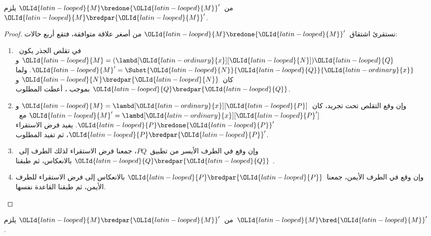 \documentclass[../../../include/open-logic-section]{subfiles}
\begin{document}


\begin{lem}
  من~${\OLId{latin-looped}{M}} \bredone {\OLId{latin-looped}{M}}'$ يلزم~${\OLId{latin-looped}{M}} \bredpar {\OLId{latin-looped}{M}}'$.
\end{lem}
\begin{proof}
  نستقرئ اشتقاق~${\OLId{latin-looped}{M}} \bredone {\OLId{latin-looped}{M}}'$ من أصغر علاقة متوافقة، فتقع أربع حالات:
  \begin{enumerate}
  \item في تقلص الجذر يكون~${\OLId{latin-looped}{M}}=(\lambd[{\OLId{latin-ordinary}{x}}][{\OLId{latin-looped}{N}}]){\OLId{latin-looped}{Q}}$ و
    ${\OLId{latin-looped}{M}}'=\Subst{{\OLId{latin-looped}{N}}}{{\OLId{latin-looped}{Q}}}{{\OLId{latin-ordinary}{x}}}$. ولما كان~${\OLId{latin-looped}{N}}\bredpar {\OLId{latin-looped}{N}}$ و${\OLId{latin-looped}{Q}}\bredpar {\OLId{latin-looped}{Q}}$
    بموجب ، أعطت
     المطلوب.
  \item وإن وقع التقلص تحت تجريد، كان~${\OLId{latin-looped}{M}}=\lambd[{\OLId{latin-ordinary}{x}}][{\OLId{latin-looped}{P}}]$ و
    ${\OLId{latin-looped}{M}}'=\lambd[{\OLId{latin-ordinary}{x}}][{\OLId{latin-looped}{P}}']$ مع~${\OLId{latin-looped}{P}}\bredone {\OLId{latin-looped}{P}}'$. يفيد فرض الاستقراء
    ${\OLId{latin-looped}{P}}\bredpar {\OLId{latin-looped}{P}}'$، ثم تفيد  المطلوب.
  \item وإن وقع في الطرف الأيسر من تطبيق~$PQ$، جمعنا فرض
    الاستقراء لذلك الطرف إلى~${\OLId{latin-looped}{Q}}\bredpar {\OLId{latin-looped}{Q}}$ بالانعكاس، ثم طبقنا
    .
  \item وإن وقع في الطرف الأيمن، جمعنا~${\OLId{latin-looped}{P}}\bredpar {\OLId{latin-looped}{P}}$ بالانعكاس
    إلى فرض الاستقراء للطرف الأيمن، ثم طبقنا القاعدة نفسها.
  \end{enumerate}
\end{proof}

\begin{lem}
  من~${\OLId{latin-looped}{M}} \bredpar {\OLId{latin-looped}{M}}'$ يلزم~${\OLId{latin-looped}{M}} \bred {\OLId{latin-looped}{M}}'$.
\end{lem}
\end{document}
